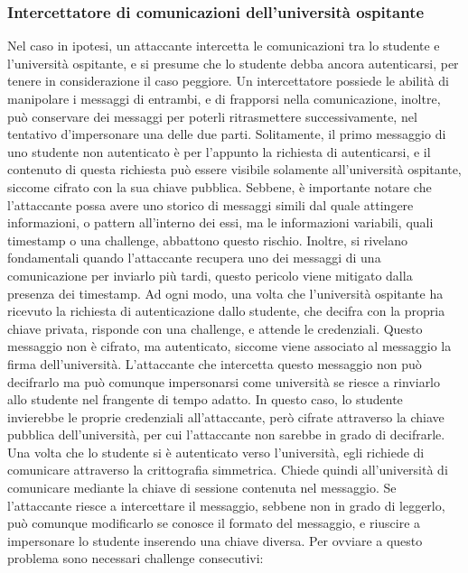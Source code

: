 \documentclass[a4paper,12pt]{article}
\begin{document}
\subsubsection{Intercettatore di comunicazioni dell'università ospitante}
Nel caso in ipotesi, un attaccante intercetta le comunicazioni tra lo studente e l'università ospitante, e si presume che lo studente debba ancora autenticarsi, per tenere in considerazione il caso peggiore. Un intercettatore possiede le abilità di manipolare i messaggi di entrambi, e di frapporsi nella comunicazione, inoltre, può conservare dei messaggi per poterli ritrasmettere successivamente, nel tentativo d'impersonare una delle due parti.
\newline Solitamente, il primo messaggio di uno studente non autenticato è per l'appunto la richiesta di autenticarsi, e il contenuto di questa richiesta può essere visibile solamente all'università ospitante, siccome cifrato con la sua chiave pubblica. Sebbene, è importante notare che l'attaccante possa avere uno storico di messaggi simili dal quale attingere informazioni, o pattern all'interno dei essi, ma le informazioni variabili, quali timestamp o una challenge, abbattono questo rischio. Inoltre, si rivelano fondamentali quando l'attaccante recupera uno dei messaggi di una comunicazione per inviarlo più tardi, questo pericolo viene mitigato dalla presenza dei timestamp.
\newline Ad ogni modo, una volta che l'università ospitante ha ricevuto la richiesta di autenticazione dallo studente, che decifra con la propria chiave privata, risponde con una challenge, e attende le credenziali. Questo messaggio non è cifrato, ma autenticato, siccome viene associato al messaggio la firma dell'università. L'attaccante che intercetta questo messaggio non può decifrarlo ma può comunque impersonarsi come università se riesce a rinviarlo allo studente nel frangente di tempo adatto. In questo caso, lo studente invierebbe le proprie credenziali all'attaccante, però cifrate attraverso la chiave pubblica dell'università, per cui l'attaccante non sarebbe in grado di decifrarle.
\newline Una volta che lo studente si è autenticato verso l'università, egli richiede di comunicare attraverso la crittografia simmetrica. Chiede quindi all'università di comunicare mediante la chiave di sessione contenuta nel messaggio. Se l'attaccante riesce a intercettare il messaggio, sebbene non in grado di leggerlo, può comunque modificarlo se conosce il formato del messaggio, e riuscire a impersonare lo studente inserendo una chiave diversa. Per ovviare a questo problema sono necessari challenge consecutivi:
\end{document}
